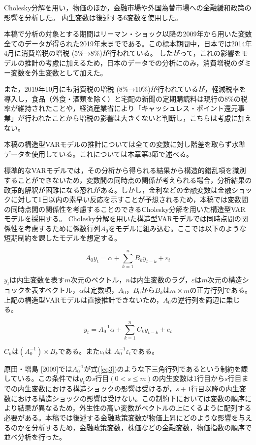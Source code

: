 \documentclass[12pt]{jarticle}
\begin{document}
{Cholesky分解を用い，物価のほか，金融市場や外国為替市場への金融緩和政策の影響を分析した。
内生変数は後述する6変数を使用した。

本稿で分析の対象とする期間はリーマン・ショック以降の2009年から用いた変数全てのデータが得られた2019年末までである。この標本期間中，日本では2014年4月に消費増税の増税 (5\%→8\%)が行われている。
したがって，これの影響をモデルの推計の考慮に加えるため，日本のデータでの分析にのみ，消費増税のダミー変数を外生変数として加えた。

また，2019年10月にも消費税の増税 (8\%→10\%)が行われているが，軽減税率を導入し，食品（外食・酒類を除く）と宅配の新聞の定期購読料は現行の8\%の税率が維持されたことや，経済産業省により「キャッシュレス・ポイント還元事業」が行われたことから増税の影響は大きくないと判断し，こちらは考慮に加えない。

本稿の構造型VARモデルの推計については全ての変数に対し階差を取らず水準データを使用している。これについては本章第3節で述べる。

標準的なVARモデルでは，その分析から得られる結果から構造的錯乱項を識別することができないため，変数間の同時点の関係が考えられる場合，分析結果の政策的解釈が困難になる恐れがある。しかし，金利などの金融変数は金融ショックに対して1日以内の素早い反応を示すことが予想されるため，本稿では変数間の同時点間の関係性を考慮することのできるCholesky分解を用いた構造型VARモデルを採用する。
Cholesky分解を用いた構造型VARモデルでは同時点間の関係性を考慮するために係数行列$A_0$をモデルに組み込む。ここでは以下のような短期制約を課したモデルを想定する。

\begin{equation}
  \label{eq1}
  A_{0} y_{t} = \alpha + \sum_{k=1}^{n} B_{k} y_{t-k} + \varepsilon_t
\end{equation}

$y_t$は内生変数を表す$m$次元のベクトル，$n$は内生変数のラグ，$\varepsilon$は$m$次元の構造ショックを表すベクトル，$\alpha$は定数項，$A_0$，$B_0$から$B_k$は$m \times m$の正方行列である。上記の構造型VARモデルは直接推計できないため，$A_0$の逆行列を両辺に乗じる。

\begin{equation}
  \label{eq2}
  y_t =A_0^{-1} \alpha + \sum_{k=1}^{n} C_{k} y_{t-k} +e_t
\end{equation}

$C_k$は$(A_0^{-1})\times B_k$である。また$e_{t}$は $A_0^{-1} \varepsilon_t$である。

原田・増島 [2009]では$A_0^{-1}$が式(\ref{eq3})のような下三角行列であるという制約を課している。この条件では$y_t$の$s$行目$(0 < s \leq m)$の内生変数は1行目から$s$行目までの内生変数における構造ショックの影響は受けるが，$s + 1$行目以降の内生変数における構造ショックの影響は受けない。この制約下においては変数の順序により結果が異なるため，外生性の高い変数がベクトルの上にくるように配列する必要がある。本稿では後述する金融政策変数が物価上昇にどのような影響を与えるのかを分析するため，金融政策変数，株価などの金融変数，物価指数の順序で並べ分析を行った。

}
\end{document}
